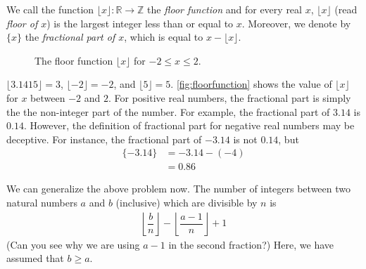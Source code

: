 \documentclass{subfile}
\begin{document}
\begin{definition}
	We call the function $\lfloor x \rfloor: \mathbb{R} \to \mathbb Z$ the \textit{floor function} and for every real $x$, $\lfloor x\rfloor$ (read \textit{floor of $x$}) is the largest integer less than or equal to $x$. Moreover, we denote by $\{x\}$ the \textit{fractional part of $x$}, which is equal to $x-\lfloor x\rfloor$.

	\begin{figure}
		\centering
		\caption{The floor function $\lfloor x \rfloor$ for $-2 \leq x \leq 2$.}
		\label{fig:floorfunction}
	\end{figure}

\end{definition}

\begin{example}
	$\lfloor 3.1415\rfloor=3$, $\lfloor-2\rfloor=-2$, and $\lfloor5\rfloor=5$. \autoref{fig:floorfunction} shows the value of $\lfloor x \rfloor$ for $x$ between $-2$ and $2$. For positive real numbers, the fractional part is simply the the non-integer part of the number. For example, the fractional part of  $3.14$ is $0.14$. However, the definition of fractional part for negative real numbers may be deceptive. For instance, the fractional part of $-3.14$ is not $0.14$, but
	\begin{align*}
		\{-3.14\} &= -3.14 - (-4)\\
		&= 0.86
	\end{align*}
\end{example}

We can generalize the above problem now. The number of integers between two natural numbers $a$ and $b$ (inclusive) which are divisible by $n$ is
\begin{align*}
	\left\lfloor\dfrac{b}{n}\right\rfloor-\left\lfloor\dfrac{a-1}{n}\right\rfloor+1
\end{align*}
(Can you see why we are using $a-1$ in the second fraction?) Here, we have assumed that $b\geq a$.
\end{document}

